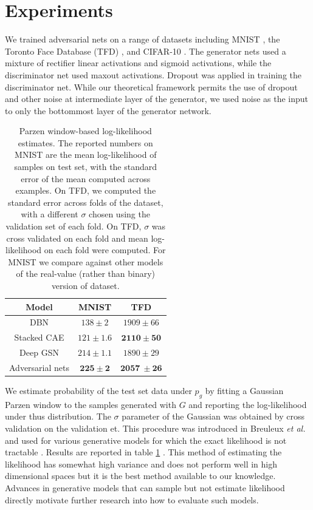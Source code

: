 \section{Experiments}

We trained adversarial nets on
a range of datasets including MNIST \cite{23_lecun1998gradient}, the Toronto Face Database (TFD) \cite{28_susskind2010toronto}, and CIFAR-10 \cite{21_krizhevsky2009learning}. The generator nets used a mixture of rectifier linear activations \cite{19_5459469,9_pmlr-v15-glorot11a} and sigmoid activations, while the discriminator net used maxout \cite{10_goodfellow2013maxoutnetworks} activations. Dropout \cite{17_hinton2012improvingneuralnetworkspreventing} was applied in training the discriminator net. While our theoretical framework permits the use of dropout and other noise at intermediate layer of the generator, we used noise as the input to only the bottommost layer of the generator network.

\begin{table}[ht]
	\centering
	\begin{tabular}{c|c|c}
		Model & MNIST & TFD\\
		\hline
		DBN \cite{3_pmlr-v28-bengio13} & $138 \pm 2$ & $1909 \pm 66$\\
		Stacked CAE \cite{3_pmlr-v28-bengio13} & $121 \pm 1.6$ & $\boldsymbol{2110 \pm 50}$\\
		Deep GSN \cite{6_pmlr-v32-bengio14} & $214 \pm 1.1$ & $1890 \pm 29$\\
		Adversarial nets & $\boldsymbol{225 \pm 2}$ & $\boldsymbol{2057\ \pm 26}$\\
	\end{tabular}
	\caption{Parzen window-based log-likelihood estimates. The reported numbers on MNIST are the mean log-likelihood of samples on test set, with the standard error of the mean computed across examples. On TFD, we computed the standard error across folds of the dataset, with a different $\sigma$ chosen using the validation set of each fold. On TFD, $\sigma$ was cross validated on each fold and mean log-likelihood on each fold were computed. For MNIST we compare against other models of the real-value (rather than binary) version of dataset.}
	\label{tab: table 1}
\end{table}

We estimate probability of the test set data under $p_g$ by fitting a Gaussian Parzen window to the samples generated with $G$ and reporting the log-likelihood under thus distribution. The $\sigma$ parameter of the Gaussian was obtained by cross validation on the validation et. This procedure was introduced in Breuleux \emph{et al.} \cite{8_6796083} and used for various generative models for which the exact likelihood is not tractable \cite{25_10.5555/3042573.3042804,3_pmlr-v28-bengio13,5_bengio2014deepgenerativestochasticnetworks}. Results are reported in table \ref{tab: table 1}
. This method of estimating the likelihood has somewhat high variance and does not perform well in high dimensional spaces but it is the best method available to our knowledge. Advances in generative models that can sample but not estimate likelihood directly motivate further research into how to evaluate such models.

